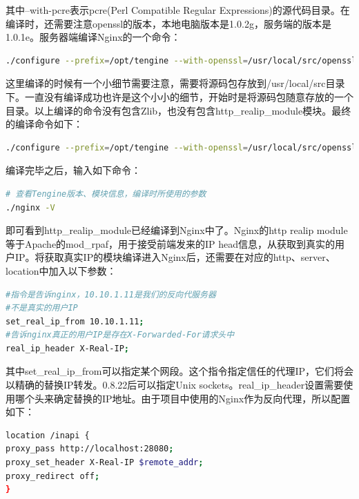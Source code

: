\documentclass[12pt]{book}
\numberwithin{dummy}{section}
\theoremstyle{ocrenumbox}
\theoremstyle{blacknumex}
\theoremstyle{blacknumbox}
\theoremstyle{ocrenum}
\begin{document}
其中--with-pcre表示pcre(Perl Compatible Regular Expressions)的源代码目录。在编译时，还需要注意openssl的版本，本地电脑版本是1.0.2g，服务端的版本是1.0.1e。服务器端编译Nginx的一个命令：

\begin{lstlisting}[language=bash]
./configure --prefix=/opt/tengine --with-openssl=/usr/local/src/openssl-OpenSSL_1_0_2g/ --without-http_gzip_module --with-pcre=/usr/local/src/pcre-8.40/
\end{lstlisting}

这里编译的时候有一个小细节需要注意，需要将源码包存放到/usr/local/src目录下。一直没有编译成功也许是这个小小的细节，开始时是将源码包随意存放的一个目录。以上编译的命令没有包含Zlib，也没有包含http\_realip\_module模块。最终的编译命令如下：

\begin{lstlisting}[language=bash]
./configure --prefix=/opt/tengine --with-openssl=/usr/local/src/openssl-OpenSSL_1_0_2g/ --with-pcre=/usr/local/src/pcre-8.40/ --with-zlib=/usr/local/src/zlib-1.2.11 --with-http_realip_module 
\end{lstlisting}

编译完毕之后，输入如下命令：

\begin{lstlisting}[language=bash]
# 查看Tengine版本、模块信息，编译时所使用的参数
./nginx -V
\end{lstlisting}

即可看到http\_realip\_module已经编译到Nginx中了。Nginx的http realip module等于Apache的mod\_rpaf，用于接受前端发来的IP head信息，从获取到真实的用户IP。将获取真实IP的模块编译进入Nginx后，还需要在对应的http、server、location中加入以下参数：

\begin{lstlisting}[language=bash]
#指令是告诉nginx，10.10.1.11是我们的反向代服务器
#不是真实的用户IP
set_real_ip_from 10.10.1.11;
#告诉nginx真正的用户IP是存在X-Forwarded-For请求头中
real_ip_header X-Real-IP;
\end{lstlisting}

其中set\_real\_ip\_from可以指定某个网段。这个指令指定信任的代理IP，它们将会以精确的替换IP转发。0.8.22后可以指定Unix sockets。real\_ip\_header设置需要使用哪个头来确定替换的IP地址。由于项目中使用的Nginx作为反向代理，所以配置如下：

\begin{lstlisting}[language=bash]
location /inapi {
proxy_pass http://localhost:28080;
proxy_set_header X-Real-IP $remote_addr;
proxy_redirect off;
}
\end{lstlisting}
\end{document}
